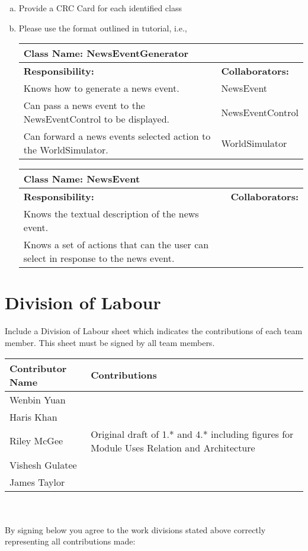 \documentclass[]{article}
\begin{document}
\begin{enumerate}[a)]
	\item Provide a CRC Card for each identified class
	\item Please use the format outlined in tutorial, i.e., 
	\begin{table}[ht]
	
		\centering
		\begin{tabular}{|p{10cm}|p{4cm}|}
		\hline 
		 \multicolumn{2}{|l|}{\textbf{Class Name: NewsEventGenerator}} \\
		\hline
		\textbf{Responsibility:} & \textbf{Collaborators:} \\
		\hline
		Knows how to generate a news event. & NewsEvent \\
		Can pass a news event to the NewsEventControl to be displayed. & NewsEventControl \\
		Can forward a news events selected action to the WorldSimulator. & WorldSimulator \\ 
		\hline
		\end{tabular}

		\begin{tabular}{|p{10cm}|p{4cm}|}
		\hline 
		 \multicolumn{2}{|l|}{\textbf{Class Name: NewsEvent}} \\
		\hline
		\textbf{Responsibility:} & \textbf{Collaborators:} \\
		\hline
		Knows the textual description of the news event. & \\
		Knows a set of actions that can the user can select in response to the news event. & \\ 
		\hline
		\end{tabular}
		
		
	\end{table}
	
\end{enumerate}

\appendix
\section{Division of Labour}
\label{sec:division_of_labour}
Include a Division of Labour sheet which indicates the contributions of each team member. This sheet must be signed by all team members.

\begin{tabular}{ | l | l | }
\hline
	\textbf{Contributor Name} & \textbf{Contributions}  \\
  	\hline
  	Wenbin Yuan & \\		
  	\hline
  	Haris Khan &  \\
  	\hline
  	Riley McGee & Original draft of 1.* and 4.* including figures for Module Uses Relation and Architecture\\
  	\hline
  	Vishesh Gulatee & \\
  	\hline
  	James Taylor & \\
  	\hline
\end{tabular}
\\
\\
By signing below you agree to the work divisions stated above correctly representing all contributions made:
\end{document}
